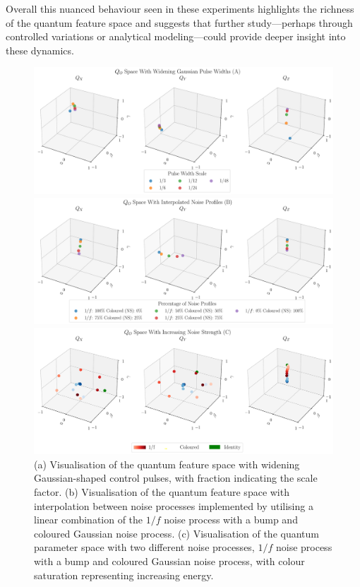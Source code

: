 \documentclass[12pt]{iopart}
\begin{document}
Overall this nuanced behaviour seen in these experiments highlights the richness of the quantum feature space and suggests that further study—perhaps through controlled variations or analytical modeling—could provide deeper insight into these dynamics.

\begin{figure}
    \centering
    \includegraphics[width=\textwidth]{figures/vis_widening_pulses.pdf}

    \vspace{1cm}

    \includegraphics[width=\textwidth]{figures/vis_interpolated_noise_profiles.pdf}

    \vspace{1cm}

    \includegraphics[width=\textwidth]{figures/vis_increasing_noise_str.pdf}
    \caption{(a) Visualisation of the quantum feature space with widening Gaussian-shaped control pulses, with fraction indicating the scale factor. (b) Visualisation of the quantum feature space with interpolation between noise processes implemented by utilising a linear combination of the $1/f$ noise process with a bump and coloured Gaussian noise process. (c) Visualisation of the quantum parameter space with two different noise processes, $1/f$ noise process with a bump and coloured Gaussian noise process, with colour saturation representing increasing energy.}
    \label{fig:vo_space_with_changing_parameters}
\end{figure}
\end{document}
